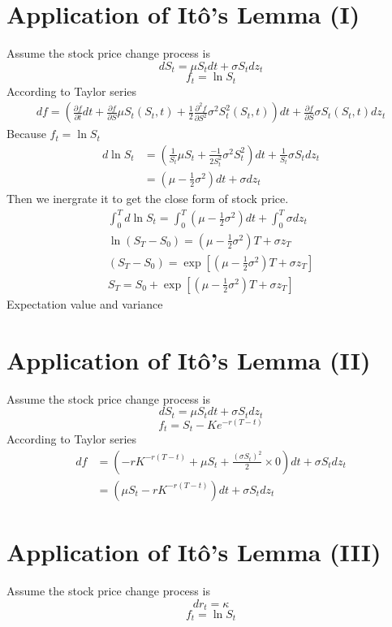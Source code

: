 \documentclass[12pt]{article}
\begin{document}
\section{Application of It\^o's Lemma (I)}
Assume the stock price change process is
\[
    dS_t = \mu S_t dt + \sigma S_t dz_t  
\]
\[
    f_t = \ln S_t
\]  
According to Taylor series
\begin{align*}
    df = (\frac{\partial f}{\partial t}dt+\frac{\partial f}{\partial S}\mu S_t(S_t, t)+\frac{1}{2}\frac{\partial^2f}{\partial S^2}\sigma^2 S_t^2(S_t, t))dt + \frac{\partial f}{\partial S}\sigma S_t(S_t, t)dz_t
\end{align*}
Because $f_t = \ln S_t$
\begin{align*}
    d\ln S_t &= (\frac{1}{S_t}\mu S_t + \frac{-1}{2S_t^2}\sigma^2S_t^2)dt + \frac{1}{S_t}\sigma S_t dz_t\\
    &= (\mu - \frac{1}{2}\sigma^2)dt + \sigma dz_t
\end{align*}
Then we inergrate it to get the close form of stock price.
\begin{align*}
   \int_0^T d\ln S_t = \int_0^T (\mu - \frac{1}{2}\sigma^2)dt + \int_0^T \sigma dz_t\\
   \ln(S_T-S_0) = (\mu-\frac{1}{2}\sigma^2)T + \sigma z_T\\
   (S_T-S_0) = \exp{[(\mu-\frac{1}{2}\sigma^2)T + \sigma z_T]}\\
   S_T = S_0 + \exp{[(\mu-\frac{1}{2}\sigma^2)T + \sigma z_T]} 
\end{align*}
Expectation value and variance
\newpage

\section{Application of It\^o's Lemma (II)}
Assume the stock price change process is
\[
    dS_t = \mu S_t dt + \sigma S_t dz_t  
\]
\[
    f_t = S_t - Ke^{-r(T-t)}
\]  
According to Taylor series
\begin{align*}
    df &= (-rK^{-r(T-t)} + \mu S_t + \frac{(\sigma S_t)^2}{2}\times 0)dt + \sigma S_t dz_t\\
    &= (\mu S_t - rK^{-r(T-t)})dt + \sigma S_t dz_t
\end{align*}

\section{Application of It\^o's Lemma (III)}
Assume the stock price change process is
\[
    dr_t = \kappa   
\]
\[
    f_t = \ln S_t
\]  
 
\end{document}
